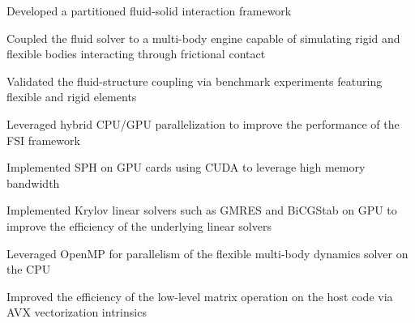\begin{compactitem}
	\item Developed a partitioned fluid-solid interaction framework
	\begin{compactitem} 
		\item  Coupled the fluid solver to a multi-body engine capable of simulating rigid and flexible bodies  interacting through frictional contact
		\item  Validated the fluid-structure coupling via benchmark experiments featuring flexible and rigid elements
	\end{compactitem}
	
	
	\item Leveraged hybrid CPU/GPU parallelization to improve the performance of the FSI framework 
	\begin{compactitem} 
		\item Implemented SPH on GPU cards using CUDA  to leverage high memory bandwidth
		\item Implemented Krylov linear solvers such as GMRES and BiCGStab on GPU to improve the efficiency of the underlying linear solvers
		\item Leveraged OpenMP for parallelism of the flexible multi-body dynamics solver on the CPU
		\item Improved the efficiency of the low-level matrix operation on the host code via AVX vectorization intrinsics
	\end{compactitem}
\end{compactitem} 